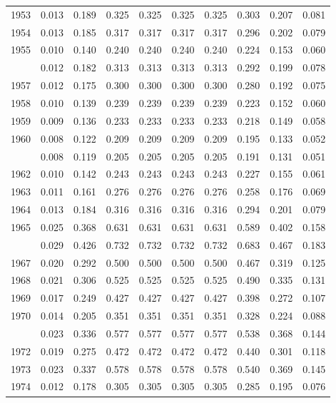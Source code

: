 \documentclass[
]{article}
\begin{document}
\begin{longtable}[t]{lrrrrrrrrr}
1953 & 0.013 & 0.189 & 0.325 & 0.325 & 0.325 & 0.325 & 0.303 & 0.207 & 0.081\\
1954 & 0.013 & 0.185 & 0.317 & 0.317 & 0.317 & 0.317 & 0.296 & 0.202 & 0.079\\
1955 & 0.010 & 0.140 & 0.240 & 0.240 & 0.240 & 0.240 & 0.224 & 0.153 & 0.060\\
\addlinespace
1956 & 0.012 & 0.182 & 0.313 & 0.313 & 0.313 & 0.313 & 0.292 & 0.199 & 0.078\\
1957 & 0.012 & 0.175 & 0.300 & 0.300 & 0.300 & 0.300 & 0.280 & 0.192 & 0.075\\
1958 & 0.010 & 0.139 & 0.239 & 0.239 & 0.239 & 0.239 & 0.223 & 0.152 & 0.060\\
1959 & 0.009 & 0.136 & 0.233 & 0.233 & 0.233 & 0.233 & 0.218 & 0.149 & 0.058\\
1960 & 0.008 & 0.122 & 0.209 & 0.209 & 0.209 & 0.209 & 0.195 & 0.133 & 0.052\\
\addlinespace
1961 & 0.008 & 0.119 & 0.205 & 0.205 & 0.205 & 0.205 & 0.191 & 0.131 & 0.051\\
1962 & 0.010 & 0.142 & 0.243 & 0.243 & 0.243 & 0.243 & 0.227 & 0.155 & 0.061\\
1963 & 0.011 & 0.161 & 0.276 & 0.276 & 0.276 & 0.276 & 0.258 & 0.176 & 0.069\\
1964 & 0.013 & 0.184 & 0.316 & 0.316 & 0.316 & 0.316 & 0.294 & 0.201 & 0.079\\
1965 & 0.025 & 0.368 & 0.631 & 0.631 & 0.631 & 0.631 & 0.589 & 0.402 & 0.158\\
\addlinespace
1966 & 0.029 & 0.426 & 0.732 & 0.732 & 0.732 & 0.732 & 0.683 & 0.467 & 0.183\\
1967 & 0.020 & 0.292 & 0.500 & 0.500 & 0.500 & 0.500 & 0.467 & 0.319 & 0.125\\
1968 & 0.021 & 0.306 & 0.525 & 0.525 & 0.525 & 0.525 & 0.490 & 0.335 & 0.131\\
1969 & 0.017 & 0.249 & 0.427 & 0.427 & 0.427 & 0.427 & 0.398 & 0.272 & 0.107\\
1970 & 0.014 & 0.205 & 0.351 & 0.351 & 0.351 & 0.351 & 0.328 & 0.224 & 0.088\\
\addlinespace
1971 & 0.023 & 0.336 & 0.577 & 0.577 & 0.577 & 0.577 & 0.538 & 0.368 & 0.144\\
1972 & 0.019 & 0.275 & 0.472 & 0.472 & 0.472 & 0.472 & 0.440 & 0.301 & 0.118\\
1973 & 0.023 & 0.337 & 0.578 & 0.578 & 0.578 & 0.578 & 0.540 & 0.369 & 0.145\\
1974 & 0.012 & 0.178 & 0.305 & 0.305 & 0.305 & 0.305 & 0.285 & 0.195 & 0.076\\

\end{longtable}
\end{document}
